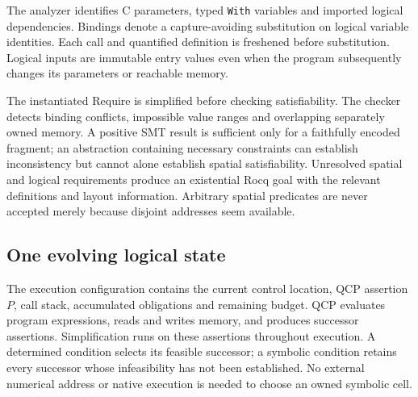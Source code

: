 The analyzer identifies C parameters, typed \texttt{With} variables and imported
logical dependencies. Bindings denote a capture-avoiding substitution on logical
variable identities. Each call and quantified definition is freshened before
substitution. Logical inputs are immutable entry values even when the program
subsequently changes its parameters or reachable memory.

The instantiated Require is simplified before checking satisfiability.
The checker detects binding conflicts, impossible value ranges and overlapping
separately owned memory. A positive SMT result is sufficient only for a
faithfully encoded fragment; an abstraction containing necessary constraints
can establish inconsistency but cannot alone establish spatial satisfiability.
Unresolved spatial and logical requirements produce an existential Rocq goal
with the relevant definitions and layout information. Arbitrary spatial
predicates are never accepted merely because disjoint addresses seem available.

\subsection{One evolving logical state}

The execution configuration contains the current control location, QCP assertion
$P$, call stack, accumulated obligations and remaining budget. QCP evaluates
program expressions, reads and writes memory, and produces successor assertions.
Simplification runs on these assertions throughout execution. A determined
condition selects its feasible successor; a symbolic condition retains every
successor whose infeasibility has not been established. No external numerical
address or native execution is needed to choose an owned symbolic cell.



